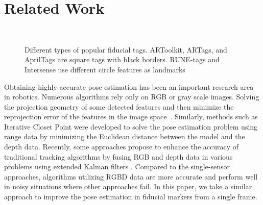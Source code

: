 \section{Related Work}
\label{sec:related}
\begin{figure}
\centering
{} \quad
{} \quad 
{} \\
 \quad
{}
\caption{Different types of popular fiducial tags. ARToolkit, ARTags, and AprilTags are square tags with black borders. RUNE-tags and Intersense use different circle features as landmarks}
\label{fig:tags}
\end{figure}
	Obtaining highly accurate pose estimation has been an important research area in robotics. Numerous algorithms rely only on RGB or gray scale images. Solving the projection geometry of some detected features and then minimize the reprojection error of the features in the image space~\citep{grest2009comparison}.  Similarly, methods such as Iterative Closet Point \citep{besl1992method} were developed to solve the pose estimation problem using range data by minimizing the Euclidean distance between the model and the depth data. Recently, some approaches propose to enhance the accuracy of traditional tracking algorithms by fusing RGB and depth data in various problems using extended Kalman filters \citep{gedik2015rgbd, assa2014robust}. Compared to the single-sensor approaches, algorithms utilizing RGBD data are more accurate and perform well in noisy situations where other approaches fail. In this paper, we take a similar approach to improve the pose estimation in fiducial markers from a single frame.
	
